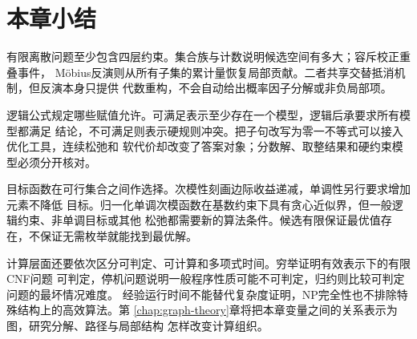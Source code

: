 \section{本章小结}
\label{sec:comb-summary}

有限离散问题至少包含四层约束。集合族与计数说明候选空间有多大；容斥校正重叠事件，
Möbius反演则从所有子集的累计量恢复局部贡献。二者共享交替抵消机制，但反演本身只提供
代数重构，不会自动给出概率因子分解或非负局部项。

逻辑公式规定哪些赋值允许。可满足表示至少存在一个模型，逻辑后承要求所有模型都满足
结论，不可满足则表示硬规则冲突。把子句改写为零一不等式可以接入优化工具，连续松弛和
软代价却改变了答案对象；分数解、取整结果和硬约束模型必须分开核对。

目标函数在可行集合之间作选择。次模性刻画边际收益递减，单调性另行要求增加元素不降低
目标。归一化单调次模函数在基数约束下具有贪心近似界，但一般逻辑约束、非单调目标或其他
松弛都需要新的算法条件。候选有限保证最优值存在，不保证无需枚举就能找到最优解。

计算层面还要依次区分可判定、可计算和多项式时间。穷举证明有效表示下的有限CNF问题
可判定，停机问题说明一般程序性质可能不可判定，归约则比较可判定问题的最坏情况难度。
经验运行时间不能替代复杂度证明，NP完全性也不排除特殊结构上的高效算法。第
\ref{chap:graph-theory}章将把本章变量之间的关系表示为图，研究分解、路径与局部结构
怎样改变计算组织。
